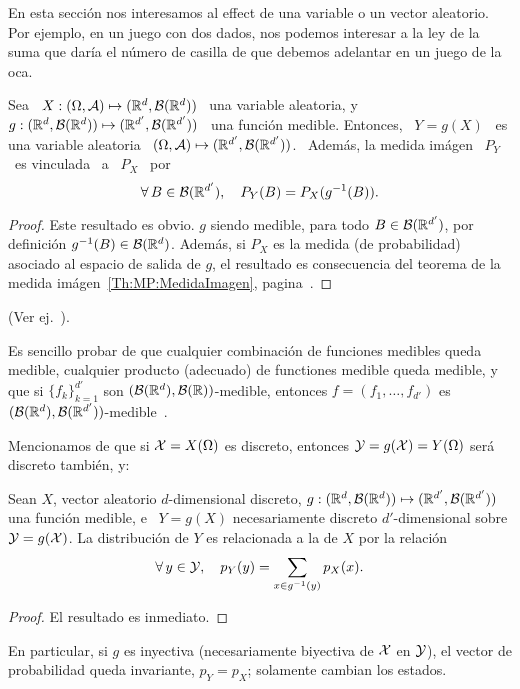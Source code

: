 En  esta  secci\'on nos  interesamos  al  effect de  una  variable  o un  vector
aleatorio. Por  ejemplo, en un juego con  dos dados, nos podemos  interesar a la
ley de la suma que dar\'ia el n\'umero de casilla de que debemos adelantar en un
juego de la oca.
%
\begin{teorema}
  Sea  \  $X:  (\Omega,\mathcal{A})  \mapsto  (\mathbb{R}^d ,  \mathcal{B}(\mathbb{R}^d))$  \  una  variable
  aleatoria,   y  \   $g:  (\mathbb{R}^d   ,  \mathcal{B}(\mathbb{R}^d))   \mapsto   (\mathbb{R}^{d'}  ,
  \mathcal{B}(\mathbb{R}^{d'}))$ \  una funci\'on  medible. Entonces,  \ $Y =  g(X)$ \  es una
  variable aleatoria  \ $(\Omega,\mathcal{A})  \mapsto (\mathbb{R}^{d'} ,  \mathcal{B}(\mathbb{R}^{d'}))$. \
  Adem\'as, la medida im\'agen \ $P_Y$ \ es vinculada \ a \ $P_X$ \ por
  \[
  \forall \, B \in \mathcal{B}(\mathbb{R}^{d'}), \quad P_Y(B) = P_X(g^{-1}(B)).
  \]
\end{teorema}
%
\begin{proof}
  Este resultado es obvio. $g$ siendo medible, para todo $B \in \mathcal{B}(\mathbb{R}^{d'})$,
  por definici\'on $g^{-1}(B) \in \mathcal{B}(\mathbb{R}^d)$.  Adem\'as, si $P_X$ es la medida
  (de  probabilidad) asociado  al  espacio de  salida  de $g$,  el resultado  es
  consecuencia  del   teorema  de  la   medida  im\'agen~\ref{Th:MP:MedidaImagen},
  pagina~\pageref{Th:MP:MedidaImagen}.
\end{proof}
%
\noindent (Ver ej.~\cite{JacPro03, AthLah06, Bog07:v2, Coh13}).


Es sencillo  probar de que  cualquier combinaci\'on de funciones  medibles queda
medible, cualquier  producto (adecuado) de  functiones medible queda  medible, y
que si $\{ f_k \}_{k=1}^{d'}$ son $(\mathcal{B}(\mathbb{R}^d),\mathcal{B}(\mathbb{R}))$-medible, entonces $f
=          (f_1         ,          \ldots         ,          f_{d'})$         es
$(\mathcal{B}(\mathbb{R}^d),\mathcal{B}(\mathbb{R}^{d'}))$-medible~\cite{AthLah06}.



Mencionamos  de que si  $\mathcal{X} =  X(\Omega)$ es  discreto, entonces  $\mathcal{Y} =  g(\mathcal{X}) =
Y(\Omega)$ ser\'a discreto tambi\'en, y:
%
\begin{teorema}
  Sean   $X$,   vector  aleatorio   $d$-dimensional   discreto,  $g:(\mathbb{R}^d   ,
  \mathcal{B}(\mathbb{R}^d)) \mapsto (\mathbb{R}^{d'} , \mathcal{B}(\mathbb{R}^{d'}))$ una funci\'on medible, e \
  $Y =  g(X)$ necesariamente discreto  $d'$-dimensional sobre $\mathcal{Y} =  g(\mathcal{X})$.  La
  distribuci\'on de $Y$ es relacionada a la de $X$ por la relaci\'on
  \[
  \forall \, y \in \mathcal{Y}, \quad p_Y(y) = \sum_{x \in g^{-1}(y)} p_X(x).
  \]
\end{teorema}
%
\begin{proof}
El resultado es inmediato.
\end{proof}
%
\noindent En particular,  si $g$ es inyectiva (necesariamente  biyectiva de $\mathcal{X}$
en $\mathcal{Y}$),  el vector  de probabilidad queda  invariante, $p_Y =  p_X$; solamente
cambian los estados.

